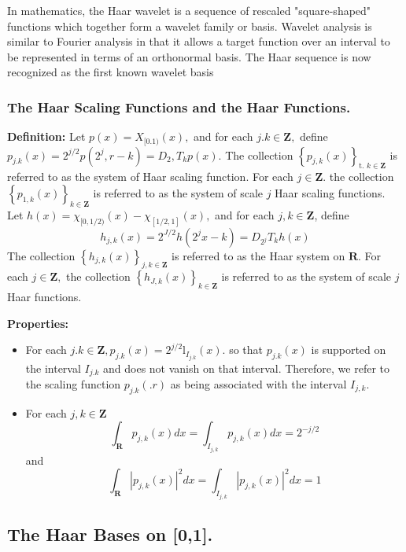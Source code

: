 \par
In mathematics, the Haar wavelet is a sequence of rescaled "square-shaped" functions which together form a wavelet family or basis. Wavelet analysis is similar to Fourier analysis in that it allows a target function over an interval to be represented in terms of an orthonormal basis. The Haar sequence is now recognized as the first known wavelet basis

\subsubsection*{The Haar Scaling Functions and the Haar Functions.}

\textbf{Definition:} Let $p(x)=X_{[0.1)}(x),$ and for each $j . k \in \mathbf{Z},$ define $p_{j . k}(x)=2^{j / 2} p\left(2^{j}, r-k\right)=D_{2}, T_{k} p(x)$. The collection $\left\{p_{j, k}(x)\right\}_{\text {t. } k \in \mathbf{Z}}$ is referred to as the system of Haar scaling function. For each $j \in \mathbf{Z}$. the collection $\left\{p_{1, k}(x)\right\}_{k \in \mathbf{Z}}$ is referred to as the system of
scale $j$ Haar scaling functions.
Let $h(x)=\chi_{[0,1 / 2)}(x)-\chi_{[1 / 2,1]}(x),$ and for each $j, k \in \mathbf{Z}$, define
$$
h_{j, k}(x)=2^{J / 2} h\left(2^{j} x-k\right)=D_{2^{j}} T_{k} h(x)
$$
The collection $\left\{h_{j, k}(x)\right\}_{j, k \in \mathbf{Z}}$ is referred to as the Haar system on $\mathbf{R}.$ For each $j \in \mathbf{Z},$ the collection $\left\{h_{J, k}(x)\right\}_{k \in \mathbf{Z}}$ is referred to as the system of scale $j$ Haar functions.


\textbf{Properties:}

\begin{itemize}
    
    \item For each $j . k \in \mathbf{Z}, p_{j . k}(x)=2^{j / 2} \mathrm{l}_{I_{j . k}}(x) .$ so that $p_{j . k}(x)$ is supported on the interval $I_{j . k}$ and does not vanish on that interval. Therefore, we refer to the scaling function $p_{j . k}(. r)$ as being associated with the interval $I_{j, k} .$
    
    \item For each $j, k \in \mathbf{Z}$
$$
\int_{\mathbf{R}} p_{j, k}(x) d x=\int_{I_{j, k}} p_{j, k}(x) d x=2^{-j / 2}
$$
and
$$
\int_{\mathbf{R}}\left|p_{j, k}(x)\right|^{2} d x=\int_{I_{j, k}}\left|p_{j, k}(x)\right|^{2} d x=1
$$
\end{itemize}

\subsection*{The Haar Bases on [0,1].}

